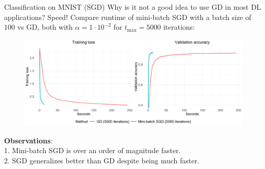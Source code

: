 \documentclass[11pt,compress,t,notes=noshow, xcolor=table]{beamer}
\begin{document}
\begin{vbframe}{Classification on MNIST (SGD)}
\vspace{-0.4cm}
Why is it not a good idea to use GD in most DL applications? Speed! Compare runtime of mini-batch SGD with a batch size of $100$ vs GD, both with $\alpha=1\cdot10^{-2}$ for $t_{\text{max}}=5000$ iterations:
\begin{figure}
            \includegraphics[width=1.0\textwidth]{slides/04-multivariate-first-order/figure_man/simu_mnist/SGD_GD_compar.pdf} \\
\end{figure} 
\textbf{Observations}:\\ 1. Mini-batch SGD is over an order of magnitude faster.\\
2. SGD generalizes better than GD despite being much faster. \\
\end{vbframe}
\end{document}
